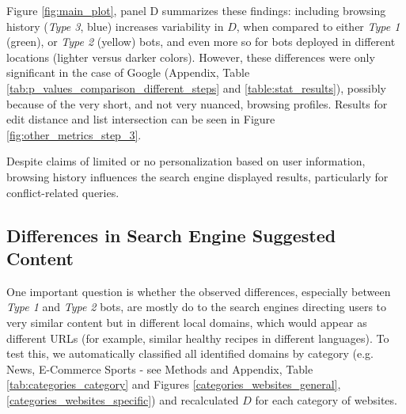 Figure \ref{fig:main_plot}, panel D summarizes these findings: including browsing history (\textit{Type 3}, blue) increases variability in $D$, when compared to either \textit{Type 1} (green), or \textit{Type 2} (yellow) bots, and even more so for bots deployed in different locations (lighter versus darker colors). However, these differences were only significant in the case of Google (Appendix, Table  \ref{tab:p_values_comparison_different_steps} and \ref{table:stat_results}), possibly because of the very short, and not very nuanced, browsing profiles. Results for edit distance and list intersection can be seen in Figure \ref{fig:other_metrics_step_3}. 




\begin{takeaway}
\takeawaytitle{}
Despite claims of limited or no personalization based on user information, browsing history influences the search engine displayed results, particularly for conflict-related queries.    
\end{takeaway}


\subsection{Differences in Search Engine Suggested Content}

One important question is whether the observed differences, especially between \textit{Type 1} and \textit{Type 2} bots, are mostly do to the search engines directing users to very similar content but in different local domains, which would appear as different URLs (for example, similar healthy recipes in different languages). To test this, we automatically classified all identified domains by category (e.g. News, E-Commerce Sports - see Methods and Appendix, Table \ref{tab:categories_category} and Figures \ref{categories_websites_general}, \ref{categories_websites_specific}) and recalculated $D$ for each category of websites. 

